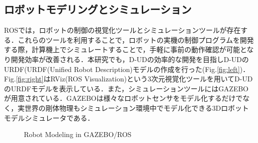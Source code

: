 \documentclass[12pt]{sonota/aislab}
\begin{document}
\subsection{ロボットモデリングとシミュレーション}
ROSでは，ロボットの制御の視覚化ツールとシミュレーションツールが存在する．これらのツールを利用することで，ロボットの実機の制御プログラムを開発する際，計算機上でシミュレートすることで，手軽に事前の動作確認が可能となり開発効率が改善される．本研究でも，D-UDの効率的な開発を目指しD-UDのURDF(URDF(Unified
Robot Description)モデルの作成を行った(Fig.\ref{fig:left})．Fig.\ref{fig:right}はRViz(ROS Visualization)という3次元視覚化ツールを用いてD-UDのURDFモデルを表示している．また，シミュレーションツールにはGAZEBO\cite{GAZEBO}が用意されている．GAZEBOは様々なロボットセンサをモデル化するだけでなく，実世界の剛体物理もシミュレーション環境中でモデル化できる3Dロボットモデルシミュレータである．

\begin{figure}[tbp]
	\begin{center}
	\hspace{5mm}
	\end{center}
	\caption{Robot Modeling in GAZEBO/ROS}
	\label{fig:Modeling}
\end{figure}
\end{document}

